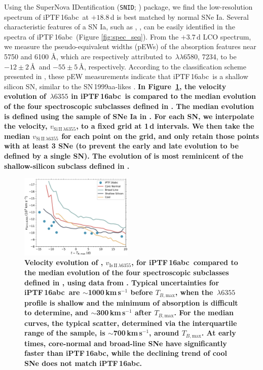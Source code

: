 \documentclass[twocolumn]{aastex61}
\newcommand{\abc}{iPTF\,16abc}
\begin{document}
Using the SuperNova IDentification (\texttt{SNID};
\citealt{2007ApJ...666.1024B}) package, we find the low-resolution spectrum of
\abc\ at $+18.8$\,d is best matched by normal SNe Ia. Several characteristic
features of a SN Ia, such as , , can be easily identified
in the spectra of \abc\ (Figure \ref{fig:spec_seq}). From the $+3.7 \,
\mathrm{d}$ LCO spectrum, we measure the pseudo-equivalent widths (pEWs) of
the absorption features near 5750 and 6100 \AA, which are respectively
attributed to \,$\lambda\lambda$6580, 7234, to be $-12 \pm 2$\,\AA\
and $-55 \pm 5$\,\AA, respectively. According to the classification scheme
presented in \citet{2006PASP..118..560B}, these pEW measurements indicate that
\abc\ is a shallow silicon SN, similar to the SN\,1999aa-likes
\citep{2009PASP..121..238B}. \textbf{In Figure~\ref{fig:branch_vel}, the
velocity evolution of \ion{Si}{2}$\,\lambda6355$ in \abc\ is compared to the
median evolution of the four spectroscopic subclasses defined in
\citet{2006PASP..118..560B}. The median evolution is defined using the sample
of SNe Ia in \citet{2012AJ....143..126B}. For each SN, we interpolate the
\ion{Si}{2} velocity, $v_{\mathrm{Si\,II}\,\lambda6355}$, to a fixed grid at
1\,d intervals. We then take the median $v_{\mathrm{Si\,II}\,\lambda6355}$ for
each point on the grid, and only retain those points with at least 3 SNe (to
prevent the early and late evolution to be defined by a single SN). The
evolution of \ion{Si}{2} is most reminicent of the shallow-silicon subclass
defined in \citet{2006PASP..118..560B}. }

\begin{figure}[htb]
  \centering
  \includegraphics[width=0.48\textwidth]{Branch_vel_evol.pdf}
  \caption{\textbf{Velocity evolution of ,   
           $v_{\mathrm{Is\,II}\,\lambda6355}$, for \abc\ compared to the median
           evolution of the four spectroscopic subclasses defined in
           \citet{2006PASP..118..560B}, using data from
           \citet{2012AJ....143..126B}. Typical uncertainties for \abc\ are
           $\sim$1000\,km\,s$^{-1}$ before $T_{B,\mathrm{max}}$, when the
           \ion{Si}{2}$\,\lambda6355$ profile is shallow and the minimum of
           absorption is difficult to determine, and $\sim$300\,km\,s$^{-1}$
           after $T_{B,\mathrm{max}}$. For the median curves, the typical
           scatter, determined via the interquartile range of the sample, is
           $\sim$700\,km\,s$^{-1}$, around $T_{B,\mathrm{max}}$.
           At early times, core-normal and broad-line SNe have significantly
           faster \ion{Si}{2} than \abc, while the declining trend of cool SNe
           does not match \abc.}
  }
  \label{fig:branch_vel}
\end{figure}
\end{document}
